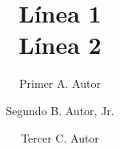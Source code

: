 \documentclass[5p,times,authoryear]{elsarticle}
\begin{document}
\begin{frontmatter}








\title{Línea 1\\ Línea 2}



\author[First]{Primer A. Autor }


\author[Second]{Segundo B. Autor, Jr.}
\author[Third]{Tercer C. Autor}



\address[First]{Filiación del primer autor.}
\address[Second]{Filiación del segundo autor.}
\address[Third]{Filiación del tercer autor.}


\end{frontmatter}
\end{document}
